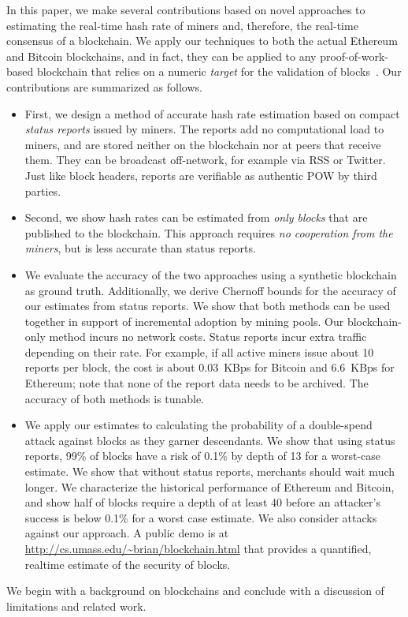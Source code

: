 \documentclass[10pt,sigconf]{acmart}
\newcommand{\para }[1]{\smallskip \noindent {\bf #1}}
\newcommand{\1}{{\em (i)}}
\newcommand{\2}{{\em (ii)}}
\newcommand{\3}{{\em (iii)}}
\newcommand{\4}{{\em (iv)}}
\newcommand{\5}{{\em (v)}}
\begin{document}
\para{Contributions.} In this paper, we make several contributions
based on novel approaches to estimating the real-time hash rate of
miners and, therefore, the real-time consensus of a blockchain. We
apply our techniques to both the actual Ethereum and Bitcoin
blockchains, and in fact, they can be applied to any
proof-of-work-based blockchain that relies on a numeric {\em target}
for the validation of blocks~\cite{sasson:2014,litecoin}. Our contributions
are summarized as follows.
\begin{itemize}[nosep,leftmargin=5ex]
\item First, we design a method of accurate hash rate estimation based
  on compact {\em status reports} issued by miners. The reports add no
  computational load to miners, and are stored neither on the
  blockchain nor at peers that receive them. They can be broadcast
  off-network, for example via RSS or Twitter. Just like block
  headers, reports are verifiable as authentic POW by third
  parties.
\item Second, we show hash rates can be estimated from {\em only
    blocks} that are published to the blockchain. This approach
  requires {\em no cooperation from the miners}, but is less accurate
  than status reports.

\item We evaluate the accuracy of the two approaches using a synthetic
  blockchain as ground truth. Additionally, we derive Chernoff bounds
  for the accuracy of our estimates from status reports. We show that both methods can be used together in
  support of incremental adoption by mining pools. Our blockchain-only
  method incurs no network costs. Status reports incur extra traffic
  depending on their rate. For example, if all active miners issue about 10 reports per block, the cost is about 0.03~KBps 
  for Bitcoin and 6.6~KBps for Ethereum; note that none of the report data needs to be archived. The accuracy of both methods is tunable.  
 

 
\item We apply our  estimates to calculating the probability of a double-spend attack against blocks as they garner descendants.  We show that using status reports,  99\% of blocks have a risk of 0.1\% by depth of 13 for a worst-case estimate. We show that without status reports, merchants should wait much longer. We  characterize the historical performance of Ethereum
  and Bitcoin, and show half of  blocks require a depth of at least 40 before an  attacker's
  success is below 0.1\% for a worst case estimate.  We also consider attacks against our approach. A public demo is at \url{http://cs.umass.edu/~brian/blockchain.html} that  
  provides a quantified, realtime estimate of the security of blocks. 
\end{itemize}
We begin with a background on blockchains and conclude with a discussion of limitations and related work.
\end{document}
